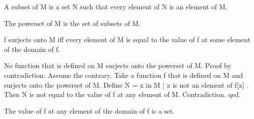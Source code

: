 \documentclass[a4paper,draft]{amsproc}
\begin{document}
\begin{ftldefinition}
A subset of M is a set N such that every element of N is an element of M.
\end{ftldefinition}

\begin{ftldefinition}
The powerset of M is the set of subsets of M.
\end{ftldefinition}

\begin{ftldefinition}
f surjects onto M iff every element of M is equal to the value of f at some element of the domain of f.
\end{ftldefinition}

\begin{ftlproposition}
No function that is defined on M surjects onto the powerset of M.
Proof by contradiction.
Assume the contrary. Take a function f that is defined on M and surjects onto the powerset of M.
Define N = { x in M | x is not an element of f[x] }.
Then N is not equal to the value of f at any element of M.
Contradiction. qed.
\end{ftlproposition}

\begin{ftltheorem}
The value of f at any element of the domain of f is a set.
\end{ftltheorem}
\end{document}
